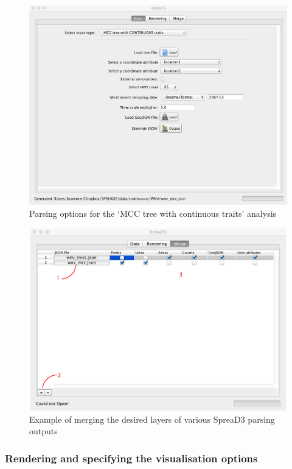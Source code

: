 \documentclass[english]{paper}
\begin{document}
\begin{figure}[!H]
\centering
\includegraphics[width=1\textwidth]{./figures/Fig_parseTrees_mcc.pdf} 
\caption{Parsing options for the `MCC tree with continuous traits' analysis}
\label{fig:renderPosteriorMCC}
\end{figure}

\begin{figure}[!H]
\centering
\includegraphics[width=1\textwidth]{./figures/Fig_mergeWNV.pdf} 
\caption{Example of merging the desired layers of various SpreaD3 parsing outputs}
\label{fig:mergeTimeSlice}
\end{figure}


\subsubsection{Rendering and specifying the visualisation options}
\end{document}
